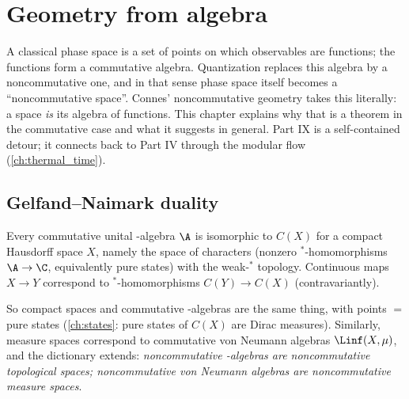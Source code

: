 \chapter{Geometry from algebra}\label{ch:gelfand}
\skippable

\begin{physmotiv}
A classical phase space is a set of points on which observables are functions; the functions form a commutative algebra. Quantization replaces this algebra by a noncommutative one, and in that sense phase space itself becomes a ``noncommutative space''. Connes' noncommutative geometry takes this literally: a space \emph{is} its algebra of functions. This chapter explains why that is a theorem in the commutative case and what it suggests in general. Part IX is a self-contained detour; it connects back to Part IV through the modular flow (\cref{ch:thermal_time}).
\end{physmotiv}

\section{Gelfand--Naimark duality}

\begin{theorem}
Every commutative unital \cstar-algebra $\A$ is isomorphic to $C(X)$ for a compact Hausdorff space $X$, namely the space of characters (nonzero $^*$-homomorphisms $\A\to\C$, equivalently pure states) with the weak-$^*$ topology. Continuous maps $X\to Y$ correspond to $^*$-homomorphisms $C(Y)\to C(X)$ (contravariantly).
\end{theorem}

So compact spaces and commutative \cstar-algebras are the same thing, with points $=$ pure states (\cref{ch:states}: pure states of $C(X)$ are Dirac measures). Similarly, measure spaces correspond to commutative von Neumann algebras $\Linf(X,\mu)$, and the dictionary extends: \emph{noncommutative \cstar-algebras are noncommutative topological spaces; noncommutative von Neumann algebras are noncommutative measure spaces}.

